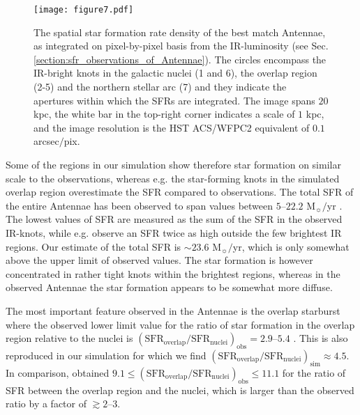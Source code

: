 \documentclass[a4paper,fleqn,usenatbib]{mnras}
\begin{document}
\begin{figure}\texttt{[image: figure7.pdf]}
\caption{The spatial star formation rate density of the best match Antennae, as integrated 
on pixel-by-pixel basis from the IR-luminosity (see Sec. \ref{section:sfr_observations_of_Antennae}). 
The circles encompass the IR-bright knots in the galactic nuclei (1 and 6), the overlap region (2-5) and the northern stellar arc (7)
and they indicate the apertures within which the SFRs are integrated. 
The image spans $20$ kpc, the white bar in the top-right corner indicates a scale of $1$ kpc, and
the image resolution is the HST ACS/WFPC2 equivalent of $0.1$ arcsec$/$pix.}
\label{fig:Antennae_spatial_sfr}
\end{figure}



Some of the regions in our simulation show therefore star formation on similar scale to the observations, whereas e.g. the star-forming knots 
in the simulated overlap region overestimate the SFR compared to observations.
The total SFR of the entire Antennae has been observed to span values between $5$--$22.2$ 
M$_{\sun}/$yr \citep{1990ApJ...349..492S, 2001ApJ...561..727Z, 2009ApJ...699.1982B, 2010A&A...518L..44K}. 
The lowest values of SFR are measured as the sum of the SFR in the observed IR-knots, while 
e.g. \citet{2010A&A...518L..44K} observe an SFR twice as high outside the few brightest IR regions.
Our estimate of the total SFR is $\sim 23.6$ M$_{\sun}/$yr,
which is only somewhat above the upper limit of observed values. The star formation is however concentrated
in rather tight knots within the brightest regions, whereas in the observed Antennae the star formation appears 
to be somewhat more diffuse.

The most important feature observed in the Antennae is the overlap starburst where the observed lower
limit value for the ratio of star formation in the overlap region relative to the nuclei 
is $(\mathrm{SFR}_{\mathrm{overlap}}/\mathrm{SFR}_{\mathrm{nuclei}})_{\mathrm{obs}}=2.9$--$5.4$ 
\citep{2009ApJ...699.1982B, 2010A&A...518L..44K}. This is also reproduced 
in our simulation for which we find
$(\mathrm{SFR}_{\mathrm{overlap}}/\mathrm{SFR}_{\mathrm{nuclei}})_{\mathrm{sim}}\approx4.5$. In comparison,
\citet{2013MNRAS.434..696K} 
obtained $9.1\le(\mathrm{SFR}_{\mathrm{overlap}}/\mathrm{SFR}_{\mathrm{nuclei}})_{\mathrm{obs}}\le11.1$ for the ratio of SFR between 
the overlap region and the nuclei, which is larger than the observed ratio by a factor of $\gtrsim 2$--$3$.
\end{document}

